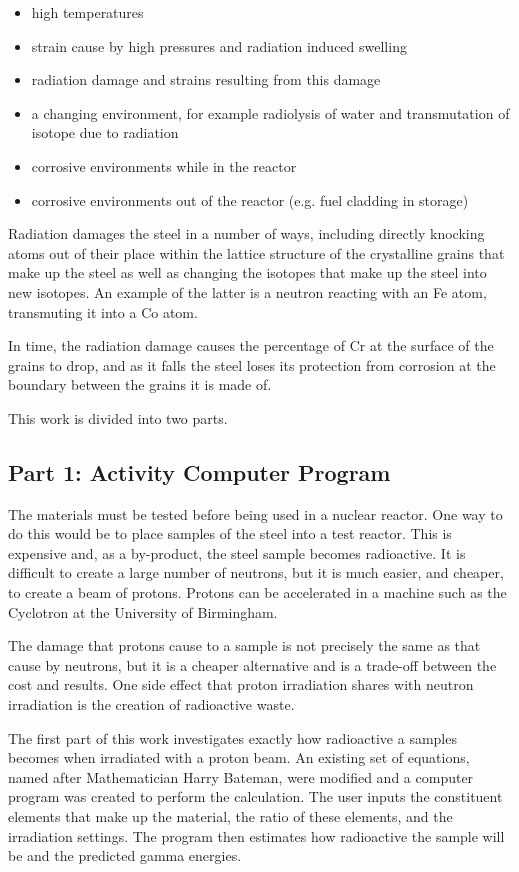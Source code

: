 \begin{itemize}
\item high temperatures
\item strain cause by high pressures and radiation induced swelling
\item radiation damage and strains resulting from this damage
\item a changing environment, for example radiolysis of water and transmutation of isotope due to radiation
\item corrosive environments while in the reactor
\item corrosive environments out of the reactor (e.g. fuel cladding in storage)
\end{itemize}

Radiation damages the steel in a number of ways, including directly knocking atoms out of their place within the lattice structure of the crystalline grains that make up the steel as well as changing the isotopes that make up the steel into new isotopes.  An example of the latter is a neutron reacting with an \Gls{Fe} atom, transmuting it into a \Gls{Co} atom.

In time, the radiation damage causes the percentage of Cr at the surface of the grains to drop, and as it falls the steel loses its protection from corrosion at the boundary between the grains it is made of.  

This work is divided into two parts.

\subsection{Part 1: Activity Computer Program}

The materials must be tested before being used in a nuclear reactor.  One way to do this would be to place samples of the steel into a test reactor.  This is expensive and, as a by-product, the steel sample becomes radioactive.  It is difficult to create a large number of neutrons, but it is much easier, and cheaper, to create a beam of protons.  Protons can be accelerated in a machine such as the Cyclotron at the University of Birmingham.  

The damage that protons cause to a sample is not precisely the same as that cause by neutrons, but it is a cheaper alternative and is a trade-off between the cost and results.  One side effect that proton irradiation shares with neutron irradiation is the creation of radioactive waste.  

The first part of this work investigates exactly how radioactive a samples becomes when irradiated with a proton beam.  An existing set of equations, named after Mathematician Harry Bateman, were modified and a computer program was created to perform the calculation.  The user inputs the constituent elements that make up the material, the ratio of these elements, and the irradiation settings.  The program then estimates how radioactive the sample will be and the predicted gamma energies.


